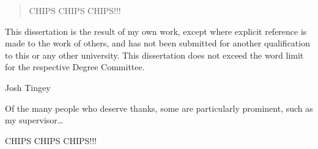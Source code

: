 
\begin{abstract}%
    CHIPS CHIPS CHIPS!!!
\end{abstract}


\begin{declaration}
    This dissertation is the result of my own work, except where explicit
    reference is made to the work of others, and has not been submitted
    for another qualification to this or any other university. This
    dissertation does not exceed the word limit for the respective Degree
    Committee.
    \vspace*{1cm}
    \begin{flushright}
        Josh Tingey
    \end{flushright}
\end{declaration}


\begin{acknowledgements}
    Of the many people who deserve thanks, some are particularly prominent,
    such as my supervisor\dots
\end{acknowledgements}


\begin{preface}
    CHIPS CHIPS CHIPS!!!
    \noindent
\end{preface}

\tableofcontents

\thispagestyle{empty}